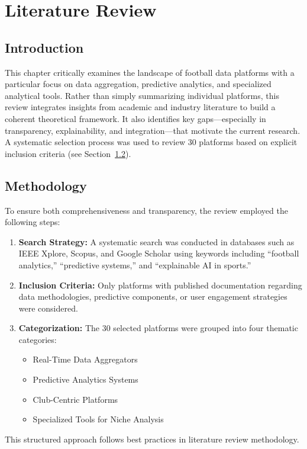 \chapter{Literature Review}
\label{chap:literature-review}

\section{Introduction}
This chapter critically examines the landscape of football data platforms with a particular focus on data aggregation, predictive analytics, and specialized analytical tools. Rather than simply summarizing individual platforms, this review integrates insights from academic and industry literature to build a coherent theoretical framework. It also identifies key gaps—especially in transparency, explainability, and integration—that motivate the current research. A systematic selection process was used to review 30 platforms based on explicit inclusion criteria (see Section~\ref{sec:methodology}).

\section{Methodology}
\label{sec:methodology}
To ensure both comprehensiveness and transparency, the review employed the following steps:
\begin{enumerate}
    \item \textbf{Search Strategy:} A systematic search was conducted in databases such as IEEE Xplore, Scopus, and Google Scholar using keywords including ``football analytics,'' ``predictive systems,'' and ``explainable AI in sports.'' 
    \item \textbf{Inclusion Criteria:} Only platforms with published documentation regarding data methodologies, predictive components, or user engagement strategies were considered.
    \item \textbf{Categorization:} The 30 selected platforms were grouped into four thematic categories:
    \begin{itemize}
        \item Real-Time Data Aggregators
        \item Predictive Analytics Systems
        \item Club-Centric Platforms
        \item Specialized Tools for Niche Analysis
    \end{itemize}
\end{enumerate}
This structured approach follows best practices in literature review methodology.

